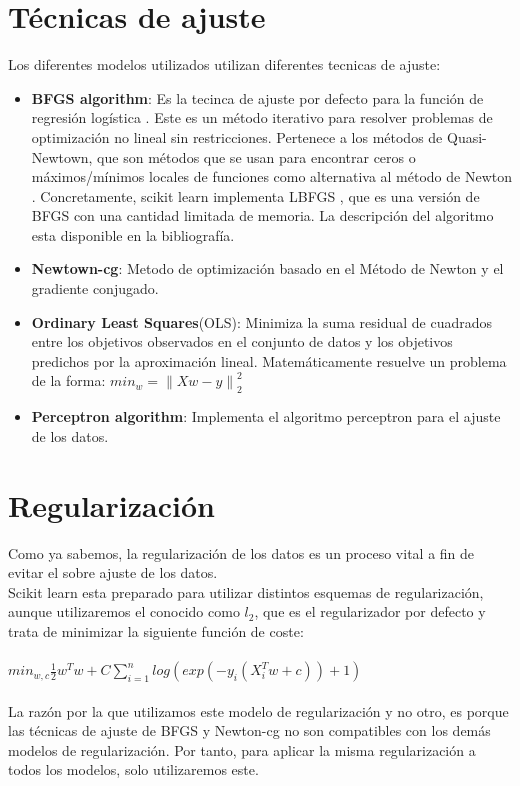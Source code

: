 \section{Técnicas de ajuste}
Los diferentes modelos utilizados utilizan diferentes tecnicas de ajuste:
\begin{itemize}
   \item \textbf{BFGS algorithm}: Es la tecinca de ajuste por defecto para la función de regresión logística \cite{linearmodels}\cite{logisticRegression}\cite{BFGS}. Este es un método iterativo para resolver problemas de optimización no lineal sin restricciones. Pertenece a los métodos de Quasi-Newtown, que son métodos que se usan para encontrar ceros o máximos/mínimos locales de funciones como alternativa al método de Newton \cite{Quasi-Newton}.
   Concretamente, scikit learn implementa LBFGS \cite{LBFGS}, que es una versión de BFGS con una cantidad limitada de memoria. La descripción del algoritmo esta disponible en la bibliografía. \cite{BFGS}\cite{LBFGS}
   \item \textbf{Newtown-cg}: Metodo de optimización basado en el Método de Newton \cite{Newton} y el gradiente conjugado. \cite{CG}
   \item \textbf{Ordinary Least Squares}(OLS): Minimiza la suma residual de cuadrados entre los objetivos observados en el conjunto de datos y los objetivos predichos por la aproximación lineal. Matemáticamente resuelve un problema de la forma: $ min_w = \left \| Xw - y \right \|^{2}_{2} $ \cite{linearmodels}
   \item \textbf{Perceptron algorithm}: Implementa el algoritmo perceptron para el ajuste de los datos. \cite{perceptron}
\end{itemize}

\section{Regularización}
Como ya sabemos, la regularización de los datos es un proceso vital a fin de evitar el sobre ajuste de los datos.\\
Scikit learn esta preparado para utilizar distintos esquemas de regularización, aunque utilizaremos el conocido como $l_2$, que es el regularizador por defecto y trata de minimizar la siguiente función de coste:\\\\
$min_{w,c} \frac{1}{2} w^T w + C \sum_{i=1}^{n}log(exp(-y_i(X^T_iw+c))+1)$ \cite{linearmodels}\\
\\
La razón por la que utilizamos este modelo de regularización y no otro, es porque las técnicas de ajuste de BFGS y Newton-cg no son compatibles con los demás modelos de regularización. Por tanto, para aplicar la misma regularización a todos los modelos, solo utilizaremos este.
\newpage

